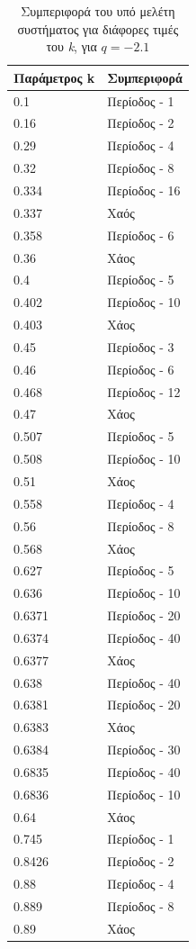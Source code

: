 \begin{table}[h!]
	\centering
	\caption{ Συμπεριφορά του υπό μελέτη συστήματος για διάφορες τιμές του \emph{k}, για $q=-2.1$ }
	\label{tab:abc9}
	\begin{tabular}{l | l}
		Παράμετρος k & Συμπεριφορά \\
		\hline
		0.1 &  Περίοδος -  1 \\
		0.16 &  Περίοδος -  2 \\
		0.29& Περίοδος -  4 \\
		0.32& Περίοδος -  8 \\
		0.334 &  Περίοδος -  16 \\
		0.337& Χαός \\
		0.358& Περίοδος -  6 \\
		0.36& Χάος \\
		0.4 &  Περίοδος -  5 \\
		0.402 &  Περίοδος -  10 \\
		0.403 &  Χάος \\
		0.45 &  Περίοδος -  3\\
		0.46 & Περίοδος -  6\\
		0.468 & Περίοδος -  12\\
		0.47 &Χάος\\
		0.507& Περίοδος -  5\\
		0.508 & Περίοδος -  10\\
		0.51 & Χάος\\
		0.558 & Περίοδος -  4\\
		0.56 & Περίοδος -  8\\
		0.568 & Χάος\\
		0.627 & Περίοδος -  5\\
		0.636 & Περίοδος -  10\\
		0.6371 & Περίοδος -  20\\
		0.6374& Περίοδος -  40\\
		0.6377 & Χάος\\
		0.638 &  Περίοδος -  40\\
		0.6381 &  Περίοδος -  20 \\
		0.6383 & Χάος\\
		0.6384 & Περίοδος -  30\\
		0.6835 & Περίοδος -  40\\
		0.6836 & Περίοδος -  10\\
		0.64 & Χάος\\
		0.745& Περίοδος -  1 \\
		0.8426& Περίοδος -  2 \\
		0.88 &  Περίοδος -  4 \\
		0.889& Περίοδος -  8\\
		0.89 &Χάος\\
		
		
	\end{tabular}

\end{table}

